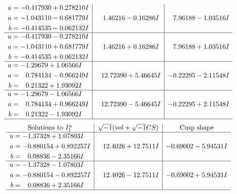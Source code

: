 \documentclass[1p]{elsarticle_modified}
\theoremstyle{definition}
\newcommand{\I}{\sqrt{-1}}
\begin{document}
$$\begin{array}{c|c|c}
\begin{aligned}
u &= -0.417930 + 0.278210 I \\
a &= -1.043110 - 0.681779 I \\
b &= -0.414535 - 0.062132 I\end{aligned}
 & \phantom{-}1.46216 - 0.16286 I & \phantom{-}7.96188 - 1.03516 I \\ \hline\begin{aligned}
u &= -0.417930 - 0.278210 I \\
a &= -1.043110 + 0.681779 I \\
b &= -0.414535 + 0.062132 I\end{aligned}
 & \phantom{-}1.46216 + 0.16286 I & \phantom{-}7.96188 + 1.03516 I \\ \hline\begin{aligned}
u &= -1.29679 + 1.06566 I \\
a &= \phantom{-}0.784134 - 0.966249 I \\
b &= \phantom{-}0.21322 + 1.93092 I\end{aligned}
 & \phantom{-}12.72390 + 5.46645 I & -0.22295 - 2.11548 I \\ \hline\begin{aligned}
u &= -1.29679 - 1.06566 I \\
a &= \phantom{-}0.784134 + 0.966249 I \\
b &= \phantom{-}0.21322 - 1.93092 I\end{aligned}
 & \phantom{-}12.72390 - 5.46645 I & -0.22295 + 2.11548 I\\
 \hline 
 \end{array}$$\newpage$$\begin{array}{c|c|c}  
\text{Solutions to }I^u_{1}& \I (\text{vol} + \sqrt{-1}CS) & \text{Cusp shape}\\
 \hline 
\begin{aligned}
u &= -1.37328 + 1.07803 I \\
a &= -0.880154 + 0.892257 I \\
b &= \phantom{-}0.08836 - 2.35166 I\end{aligned}
 & \phantom{-}12.4026 + 12.7511 I & -0.69002 - 5.94531 I \\ \hline\begin{aligned}
u &= -1.37328 - 1.07803 I \\
a &= -0.880154 - 0.892257 I \\
b &= \phantom{-}0.08836 + 2.35166 I\end{aligned}
 & \phantom{-}12.4026 - 12.7511 I & -0.69002 + 5.94531 I\\
 \hline 
 \end{array}$$\newpage\newpage\renewcommand{\arraystretch}{1}
\end{document}
